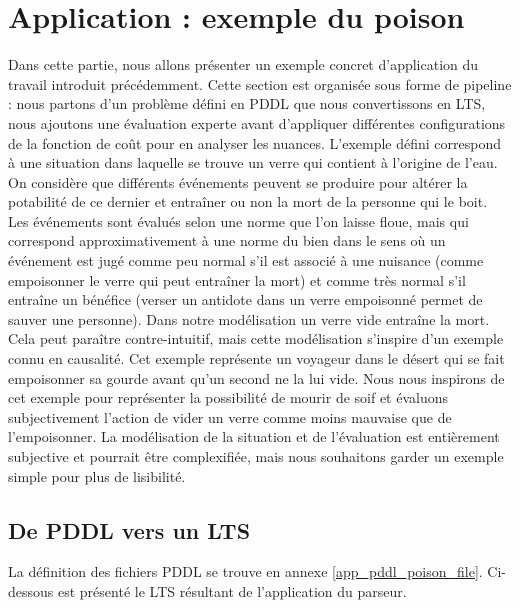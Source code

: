 \section{Application : exemple du poison}\label{ex_poison}

Dans cette partie, nous allons présenter un exemple concret d'application du travail introduit précédemment. Cette section est organisée sous forme de pipeline : nous partons d'un problème défini en PDDL que nous convertissons en LTS, nous ajoutons une évaluation experte avant d'appliquer différentes configurations de la fonction de coût pour en analyser les nuances. L'exemple défini correspond à une situation dans laquelle se trouve un verre qui contient à l'origine de l'eau. On considère que différents événements peuvent se produire pour altérer la potabilité de ce dernier et entraîner ou non la mort de la personne qui le boit. Les événements sont évalués selon une norme que l'on laisse floue, mais qui correspond approximativement à une norme du bien dans le sens où un événement est jugé comme peu normal s'il est associé à une nuisance  (comme empoisonner le verre qui peut entraîner la mort) et comme très normal s'il entraîne un bénéfice (verser un antidote dans un verre empoisonné permet de sauver une personne). Dans notre modélisation un verre vide entraîne la mort. Cela peut paraître contre-intuitif, mais cette modélisation s'inspire d'un exemple connu en causalité. Cet exemple représente un voyageur dans le désert qui se fait empoisonner sa gourde avant qu'un second ne la lui vide. Nous nous inspirons de cet exemple pour représenter la possibilité de mourir de soif et évaluons subjectivement l'action de vider un verre comme moins mauvaise que de l'empoisonner. La modélisation de la situation et de l'évaluation est entièrement subjective et pourrait être complexifiée, mais nous souhaitons garder un exemple simple pour plus de lisibilité. 

\subsection{De PDDL vers un LTS}

La définition des fichiers PDDL se trouve en annexe \ref{app_pddl_poison_file}. Ci-dessous est présenté le LTS résultant de l'application du parseur.

